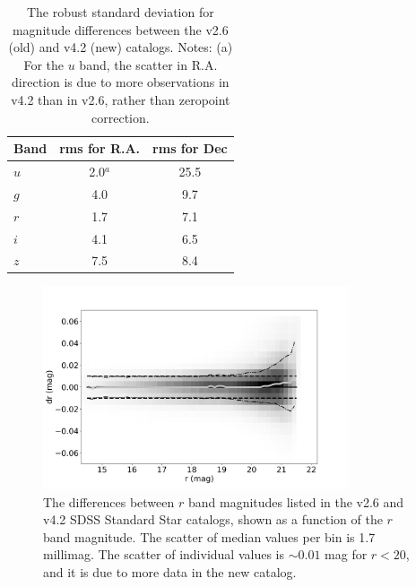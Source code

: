 \documentclass[fleqn,usenatbib]{mnras}
\begin{document}
\begin{table}
	\centering
	\begin{tabular}{l|c|c} %
		\hline
		Band & rms for R.A. & rms for Dec \\
		\hline
       $u$        &        2.0$^a$    &    25.5      \\
       $g$        &        4.0    &      9.7      \\  
       $r$         &        1.7    &      7.1      \\  
       $i$         &        4.1    &      6.5      \\ 
       $z$        &        7.5    &      8.4      \\ 
		\hline
	\end{tabular}
	\caption{The robust standard deviation for magnitude differences between the v2.6 (old) and v4.2 (new) catalogs. Notes: (a) For the $u$ band, the scatter in R.A. direction is due to more observations in v4.2 than in v2.6, rather than zeropoint correction.}
	\label{tab:oldnewRMS}
\end{table}


\begin{figure}[th!]
    \centering\includegraphics[width=9cm]{figures/testV26vsV42_r_dr_r_mag_Hess.png} 
\caption{The differences between $r$ band magnitudes listed in the v2.6 and v4.2 
SDSS Standard Star catalogs,  shown as a function of the $r$ band magnitude. The 
scatter of median values per bin is 1.7 millimag. The scatter of individual values is 
$\sim0.01$ mag for $r<20$, and it is due to more data in the new catalog.} 
\label{fig:v26v34drr}
\end{figure}
\end{document}
